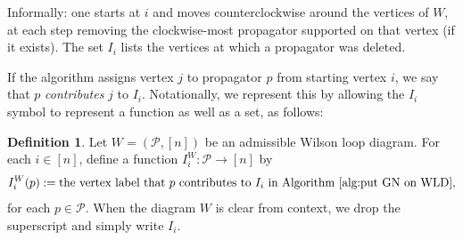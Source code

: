 \documentclass[11pt]{article}
\newcommand{\cP}{\mathcal{P}}
\theoremstyle{remark}
\theoremstyle{definition}
\newtheorem{dfn}[thm]{Definition}
\begin{document}
Informally: one starts at $i$ and moves counterclockwise around the vertices of $W$, at each step removing the clockwise-most propagator supported on that vertex (if it exists). The set $I_i$ lists the vertices at which a propagator was deleted. 


If the algorithm assigns vertex $j$ to propagator $p$ from starting vertex $i$, we say that $p$ \emph{contributes} $j$ to $I_i$. Notationally, we represent this by allowing the $I_i$ symbol to represent a function as well as a set, as follows:
\begin{dfn}\label{def I_i as a function}
Let $W = (\cP, [n])$ be an admissible Wilson loop diagram. For each $i \in [n]$, define a function $I_i^W : \cP \longrightarrow [n]$ by
\[I_i^W(p) := \text{the vertex label that $p$ contributes to $I_i$ in Algorithm~\ref{alg:put GN on WLD},}\]
for each $p \in \cP$. When the diagram $W$ is clear from context, we drop the superscript and simply write $I_i$.
\end{dfn}
\end{document}
